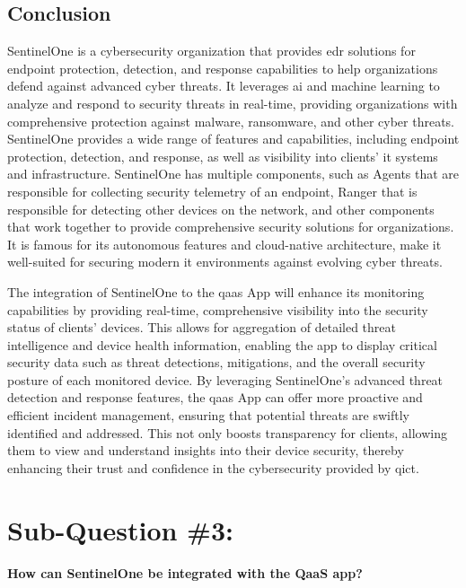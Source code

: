 \subsection{Conclusion}

SentinelOne is a cybersecurity organization that provides \acrshort{edr} solutions for endpoint protection, detection, and response
capabilities to help organizations defend against advanced cyber threats. It leverages \acrshort{ai} and machine learning to
analyze and respond to security threats in real-time, providing organizations with comprehensive protection against
malware, ransomware, and other cyber threats. SentinelOne provides a wide range of features and capabilities, including
endpoint protection, detection, and response, as well as visibility into clients' \acrshort{it} systems and infrastructure.
SentinelOne has multiple components, such as Agents that are responsible for collecting security telemetry of an endpoint,
Ranger that is responsible for detecting other devices on the network, and other components that work together to provide
comprehensive security solutions for organizations. It is famous for its autonomous features and cloud-native architecture,
make it well-suited for securing modern \acrshort{it} environments against evolving cyber threats.

The integration of SentinelOne to the \acrshort{qaas} App will enhance its monitoring capabilities by providing real-time,
comprehensive visibility into the security status of clients' devices. This allows for aggregation of detailed threat
intelligence and device health information, enabling the app to display critical security data such as threat detections,
mitigations, and the overall security posture of each monitored device. By leveraging SentinelOne's advanced threat
detection and response features, the \acrshort{qaas} App can offer more proactive and efficient incident management,
ensuring that potential threats are swiftly identified and addressed. This not only boosts transparency for clients,
allowing them to view and understand insights into their device security, thereby enhancing their trust and confidence
in the cybersecurity provided by \acrshort{qict}.

\section{Sub-Question \#3:}

\textbf{How can SentinelOne be integrated with the QaaS app?}

